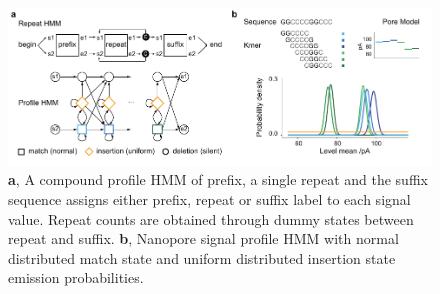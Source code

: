 \cite{Schreiber2015}

\begin{figure}[h]
	\centering
	\includegraphics[width=1.0\textwidth]{figures/signal/count_hmm.pdf}
	\captionsetup{format=plain}
	\caption[Nanopore signal processing with STRique]{\textbf{a}, A compound profile HMM of prefix, a single repeat and the suffix sequence assigns either prefix, repeat or suffix label to each signal value. Repeat counts are obtained through dummy states between repeat and suffix. \textbf{b}, Nanopore signal profile HMM with normal distributed match state and uniform distributed insertion state emission probabilities.}
	\label{fig:strique:count_hmm}
\end{figure}